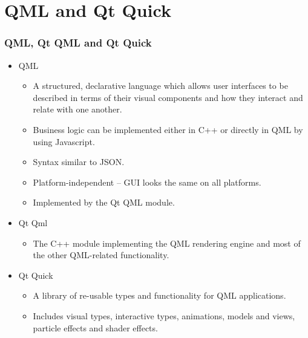 \section{QML and Qt Quick}

\begin{frame}
  \frametitle{QML, Qt QML and Qt Quick}
  \begin{itemize}
    \item QML
    \begin{itemize}
      \footnotesize
      \item A structured, declarative language which allows user interfaces to
        be described in terms of their visual components and how they interact
        and relate with one another.
      \item Business logic can be implemented either in C++ or directly in QML
        by using Javascript.
      \item Syntax similar to JSON.
      \item Platform-independent -- GUI looks the same on all platforms.
      \item Implemented by the Qt QML module.
    \end{itemize}
    \item Qt Qml
    \begin{itemize}
      \footnotesize
      \item The C++ module implementing the QML rendering engine and most of the
        other QML-related functionality.
    \end{itemize}
    \item Qt Quick
    \begin{itemize}
      \footnotesize
      \item A library of re-usable types and functionality for QML applications.
      \item Includes visual types, interactive types, animations, models and views,
        particle effects and shader effects.
    \end{itemize}
  \end{itemize}
\end{frame}


